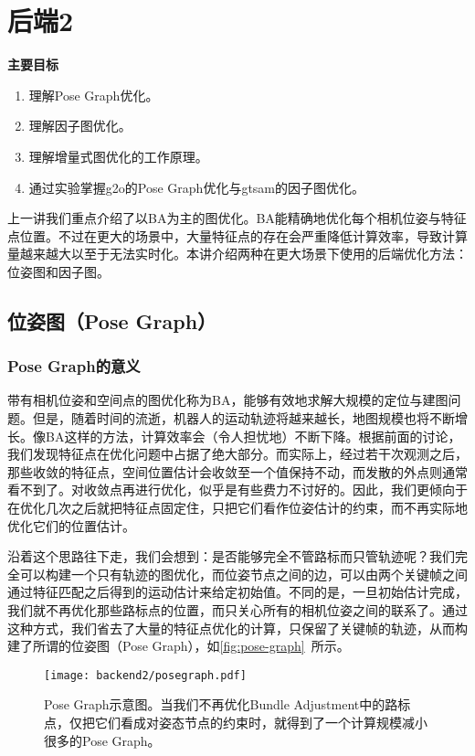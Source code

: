 \chapter{后端2}
\begin{mdframed}  
	\textbf{主要目标}
	\begin{enumerate}[labelindent=0em,leftmargin=1.5em]
		\item 理解Pose Graph优化。
		\item 理解因子图优化。
		\item 理解增量式图优化的工作原理。
		\item 通过实验掌握g2o的Pose Graph优化与gtsam的因子图优化。
	\end{enumerate}
\end{mdframed}

上一讲我们重点介绍了以BA为主的图优化。BA能精确地优化每个相机位姿与特征点位置。不过在更大的场景中，大量特征点的存在会严重降低计算效率，导致计算量越来越大以至于无法实时化。本讲介绍两种在更大场景下使用的后端优化方法：位姿图和因子图。

\newpage
\section{位姿图（Pose Graph）}
\subsection{Pose Graph的意义}
带有相机位姿和空间点的图优化称为BA，能够有效地求解大规模的定位与建图问题。但是，随着时间的流逝，机器人的运动轨迹将越来越长，地图规模也将不断增长。像BA这样的方法，计算效率会（令人担忧地）不断下降。根据前面的讨论，我们发现特征点在优化问题中占据了绝大部分。而实际上，经过若干次观测之后，那些收敛的特征点，空间位置估计会收敛至一个值保持不动，而发散的外点则通常看不到了。对收敛点再进行优化，似乎是有些费力不讨好的。因此，我们更倾向于在优化几次之后就把特征点固定住，只把它们看作位姿估计的约束，而不再实际地优化它们的位置估计。

沿着这个思路往下走，我们会想到：是否能够完全不管路标而只管轨迹呢？我们完全可以构建一个只有轨迹的图优化，而位姿节点之间的边，可以由两个关键帧之间通过特征匹配之后得到的运动估计来给定初始值。不同的是，一旦初始估计完成，我们就不再优化那些路标点的位置，而只关心所有的相机位姿之间的联系了。通过这种方式，我们省去了大量的特征点优化的计算，只保留了关键帧的轨迹，从而构建了所谓的位姿图（Pose Graph），如\autoref{fig:pose-graph}~所示。

\begin{figure}[!ht]
	\centering
	\texttt{[image: backend2/posegraph.pdf]}
	\caption{Pose Graph示意图。当我们不再优化Bundle Adjustment中的路标点，仅把它们看成对姿态节点的约束时，就得到了一个计算规模减小很多的Pose Graph。}
	\label{fig:pose-graph}
\end{figure}

